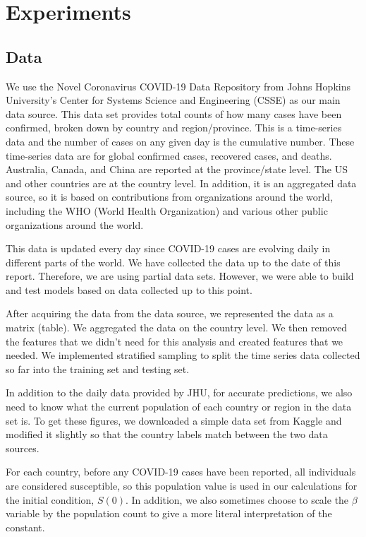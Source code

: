 \documentclass[11pt]{article}
\begin{document}
\section{Experiments}
\subsection{Data}
We use the Novel Coronavirus COVID-19 Data Repository from Johns Hopkins University’s Center for Systems Science and Engineering (CSSE) \cite{JHU-data} as our main data source. This data set provides total counts of how many cases have been confirmed, broken down by country and region/province. This is a time-series data and the number of cases on any given day is the cumulative number. These time-series data are for global confirmed cases, recovered cases, and deaths. Australia, Canada, and China are reported at the province/state level. The US and other countries are at the country level. In addition, it is an aggregated data source, so it is based on contributions from organizations around the world, including the WHO (World Health Organization) and various other public organizations around the world.

This data is updated every day since COVID-19 cases are evolving daily in different parts of the world. We have collected the data up to the date of this report. Therefore, we are using partial data sets. However, we were able to build and test models based on data collected up to this point.

After acquiring the data from the data source, we represented the data as a matrix (table). We aggregated the data on the country level. We then removed the features that we didn't need for this analysis and created features that we needed. We implemented stratified sampling to split the time series data collected so far into the training set and testing set.

In addition to the daily data provided by JHU, for accurate predictions, we also need to know what the current population of each country or region in the data set is. To get these figures, we downloaded a simple data set from Kaggle \cite{population-csv} and modified it slightly so that the country labels match between the two data sources.

For each country, before any COVID-19 cases have been reported, all individuals are considered susceptible, so this population value is used in our calculations for the initial condition, $S(0)$. In addition, we also sometimes choose to scale the $\beta$ variable by the population count to give a more literal interpretation of the constant.
\end{document}
